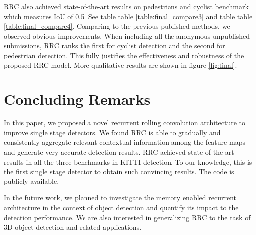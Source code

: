 \documentclass[10pt,twocolumn,letterpaper]{article}
\begin{document}
RRC also achieved state-of-the-art results on pedestrians and cyclist benchmark which measures IoU of 0.5. See table table \ref{table:final_compare3} and table table \ref{table:final_compare4}. Comparing to the previous published methods, we observed obvious improvements. When including all the anonymous unpublished submissions, RRC ranks the first for cyclist detection and the second for pedestrian detection. This fully justifies the effectiveness and robustness of the proposed RRC model. More qualitative results are shown in figure \ref{fig:final}.

\section{Concluding Remarks}
In this paper, we proposed a novel recurrent rolling convolution architecture to improve single stage detectors. We found RRC is able to gradually and consistently aggregate relevant contextual information among the feature maps and generate very accurate detection results. RRC achieved state-of-the-art results in all the three benchmarks in KITTI detection. To our knowledge, this is the first single stage detector to obtain such convincing results. The code is publicly available.

In the future work, we planned to investigate the memory enabled recurrent architecture in the context of object detection and quantify its impact to the detection performance. We are also interested in generalizing RRC to the task of 3D object detection and related applications.


{\small


}
\end{document}
